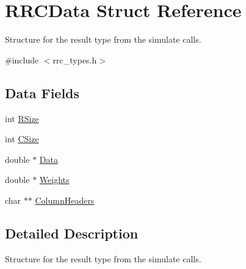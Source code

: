 \hypertarget{struct_r_r_c_data}{\section{R\-R\-C\-Data Struct Reference}
\label{struct_r_r_c_data}
}


Structure for the result type from the simulate calls.  




{\ttfamily \#include $<$rrc\-\_\-types.\-h$>$}

\subsection*{Data Fields}
\begin{DoxyCompactItemize}
\item 
int \hyperlink{struct_r_r_c_data_a4d8512c879223c0e0d1522dae38e7819}{R\-Size}
\item 
int \hyperlink{struct_r_r_c_data_a17c9a5894aa9cb3789346dcaa9c370bb}{C\-Size}
\item 
double $\ast$ \hyperlink{struct_r_r_c_data_a7c5cbda3aa940f4b0d6e8a1679307dfc}{Data}
\item 
double $\ast$ \hyperlink{struct_r_r_c_data_a557faafe2bb582e0c88078603aacb1c7}{Weights}
\item 
char $\ast$$\ast$ \hyperlink{struct_r_r_c_data_ab339159e5604808f92fe793f4f43da03}{Column\-Headers}
\end{DoxyCompactItemize}


\subsection{Detailed Description}
Structure for the result type from the simulate calls. 

